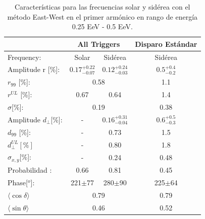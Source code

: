 \documentclass[12pt, doublespace, oneside]{article}
\begin{document}
\begin{table}[H]
    \begin{small}
        \begin{center}
            \begin{tabular}[c]{l|c|c||c|}
\cline{2-4}                                       & \multicolumn{2}{c||}{All Triggers}    & \multicolumn{1}{c|}{Disparo Estándar}   \\ \hline
\multicolumn{1}{|l|}{Frequency:                } & Solar	                & Sidérea	                & Sidérea \cite{Aab_2020}   \\ \hline
\multicolumn{1}{|l|}{Amplitude r [\%]:           } & $0.17^{+0.22}_{-0.07}$	& $0.12^{+0.24}_{-0.03}$ 	& $0.5^{+0.4}_{-0.2}$ \cite{codigo}      \\
\multicolumn{1}{|l|}{$r_{99}$ [\%]:             } & \multicolumn{2}{c||}{0.58}                          & 1.1\cite{codigo}                 \\
\multicolumn{1}{|l|}{$r^{UL}$ [\%]:             } & 0.67 	                & 0.64                      & 1.4\cite{codigo}                 \\ 
\multicolumn{1}{|l|}{$\sigma$[\%]:              } & \multicolumn{2}{c||}{0.19}                          & 0.38\cite{codigo}       \\\hline
\multicolumn{1}{|l|}{Amplitude $d_\perp$[\%]:    } & -	                    & $0.16^{+0.31}_{-0.04}$ 	& $0.6^{+0.5}_{-0.3}$       \\
\multicolumn{1}{|l|}{$d_{99}$ [\%]:             } & - 	                    & 0.73                      & 1.5  \cite{codigo}                \\
\multicolumn{1}{|l|}{$d_{\perp}^{UL}[\%]$       } & -                       & 0.80                      & 1.8                         \\
\multicolumn{1}{|l|}{$\sigma_{x,y}$[\%]:        } & -	                    & 0.24	                    & 0.48       \\\hline
\multicolumn{1}{|l|}{Probabilidad      :        } & 0.66                    & 0.81	                    & 0.45       \\
\multicolumn{1}{|l|}{Phase[$^o$]:                } & 221$\pm$77              & 280$\pm$90                & 225$\pm$64\\ \hline
\multicolumn{1}{|l|}{$\langle\cos\delta \rangle$} & \multicolumn{2}{c||}{0.79}        	                & 0.79 \cite{codigo}        \\        
\multicolumn{1}{|l|}{$\langle\sin\theta \rangle$} & \multicolumn{2}{c||}{0.46}        	                & 0.52 \cite{codigo}        \\ \hline       
            \end{tabular}
            
        \end{center}
    \end{small}
    \caption{Características para las frecuencias solar y sidérea con el método East-West en el primer armónico en rango de energía 0.25 EeV - 0.5 EeV.}
    \label{tab:primer_bin_data}
\end{table}
\end{document}
